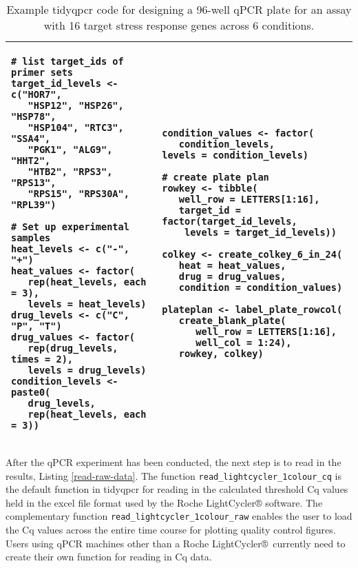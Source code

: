 \documentclass[../main.tex]{subfiles}
\begin{document}
\makeatletter
\renewcommand{\fnum@table}{Listing \thetable}
\makeatother

\begin{table}
\centering
\begin{tabular}{ |p{5.6cm}  p{5.6cm}|}
\hline
  \begin{lstlisting}[style=mystyle]
# list target_ids of primer sets
target_id_levels <- c("HOR7",
   "HSP12", "HSP26", "HSP78",
   "HSP104", "RTC3", "SSA4",
   "PGK1", "ALG9", "HHT2",
   "HTB2", "RPS3", "RPS13",
   "RPS15", "RPS30A", "RPL39")

# Set up experimental samples
heat_levels <- c("-", "+")
heat_values <- factor(
   rep(heat_levels, each = 3),
   levels = heat_levels)
drug_levels <- c("C", "P", "T")
drug_values <- factor(
   rep(drug_levels, times = 2),
   levels = drug_levels)
condition_levels <- paste0(
   drug_levels,
   rep(heat_levels, each = 3))
\end{lstlisting}
 & 
 \begin{lstlisting}[firstnumber=20,style=mystyle]
condition_values <- factor(
   condition_levels,
levels = condition_levels)
 
# create plate plan
rowkey <- tibble(
   well_row = LETTERS[1:16],
   target_id = factor(target_id_levels, 
    levels = target_id_levels))

colkey <- create_colkey_6_in_24(
   heat = heat_values,
   drug = drug_values,
   condition = condition_values)

plateplan <- label_plate_rowcol(
   create_blank_plate(
      well_row = LETTERS[1:16],
      well_col = 1:24),
   rowkey, colkey)
\end{lstlisting} \\ 
\hline
\end{tabular}
\caption{Example tidyqpcr code for designing a 96-well qPCR plate for an assay with 16 target stress response genes across 6 conditions.}
\label{tab:create-plate-plan}
\end{table}
After the qPCR experiment has been conducted, the next step is to read in the results, Listing \ref{read-raw-data}. 
The function \lstinline{read_lightcycler_1colour_cq} is the default function in tidyqpcr for reading in the calculated threshold Cq values held in the excel file format used by the Roche LightCycler® software. 
The complementary function \lstinline{read_lightcycler}\lstinline{_1colour_raw} enables the user to load the Cq values across the entire time course for plotting quality control figures. 
Users using qPCR machines other than a Roche LightCycler® currently need to create their own function for reading in Cq data. 
\end{document}
